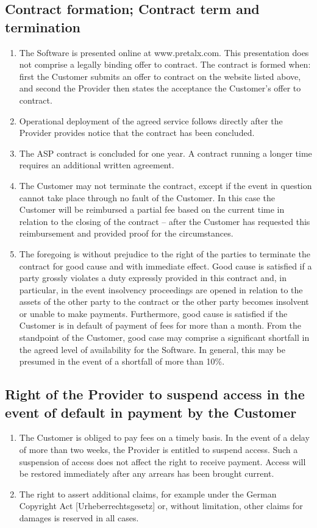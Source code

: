 \documentclass{terms}
\begin{document}
\subsection{Contract formation; Contract term and termination}
\begin{enumerate}
\item The Software is presented online at www.pretalx.com.
      This presentation does not comprise a legally binding offer to contract.
      The contract is formed when: first the Customer submits an offer to contract on the website listed above, and second the Provider then states the acceptance the Customer's offer to contract.
\item Operational deployment of the agreed service follows directly after the Provider provides notice that the contract has been concluded.
\item The ASP contract is concluded for one year.
      A contract running a longer time requires an additional written agreement.
\item The Customer may not terminate the contract, except if the event in question cannot take place through no fault of the Customer.
      In this case the Customer will be reimbursed a partial fee based on the current time in relation to the closing of the contract – after the Customer has requested this reimbursement and provided proof for the circumstances.
\item The foregoing is without prejudice to the right of the parties to terminate the contract for good cause and with immediate effect.
      Good cause is satisfied if a party grossly violates a duty expressly provided in this contract and, in particular, in the event insolvency proceedings are opened in relation to the assets of the other party to the contract or the other party becomes insolvent or unable to make payments.
      Furthermore, good cause is satisfied if the Customer is in default of payment of fees for more than a month.
      From the standpoint of the Customer, good case may comprise a significant shortfall in the agreed level of availability for the Software.
      In general, this may be presumed in the event of a shortfall of more than 10\%.
\end{enumerate}

\subsection{Right of the Provider to suspend access in the event of default in payment by the Customer}
\begin{enumerate}
\item The Customer is obliged to pay fees on a timely basis.
      In the event of a delay of more than two weeks, the Provider is entitled to suspend access.
      Such a suspension of access does not affect the right to receive payment.
      Access will be restored immediately after any arrears has been brought current.
\item The right to assert additional claims, for example under the German Copyright Act [Urheberrechtsgesetz] or, without limitation, other claims for damages is reserved in all cases.
\end{enumerate}
\end{document}
